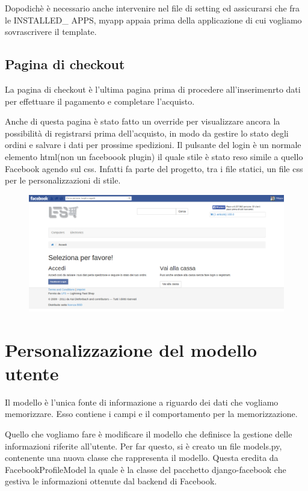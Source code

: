 Dopodichè è necessario anche intervenire nel file di setting ed assicurarsi che fra le INSTALLED\_ APPS, myapp appaia prima della applicazione di cui vogliamo sovrascrivere il template.

\subsection{Pagina di checkout}
La pagina di checkout è l'ultima pagina prima di procedere all'inserimenrto dati per effettuare il pagamento e completare l'acquisto.

Anche di questa pagina è stato fatto un override per visualizzare ancora la possibilità di registrarsi prima dell'acquisto, in modo da gestire lo stato degli ordini e salvare i dati per prossime spedizioni. Il pulsante del login è un normale elemento html(non un faceboook plugin) il quale stile è stato reso simile a quello Facebook agendo sul css. Infatti fa parte del progetto, tra i file statici, un file css per le personalizzazioni di stile.

\begin{figure}
\includegraphics[width=0.9\columnwidth]{img/checkout}
\end{figure}

\section{Personalizzazione del modello utente}
Il modello è l'unica fonte di informazione a riguardo dei dati che vogliamo memorizzare. Esso contiene i campi e il comportamento per la memorizzazione. 

Quello che vogliamo fare è modificare il modello che definisce la gestione delle informazioni riferite all'utente. Per far questo, si è creato un file models.py, contenente una nuova classe che rappresenta il modello. Questa eredita da FacebookProfileModel la quale è la classe del pacchetto django-facebook che gestiva le informazioni ottenute dal backend di Facebook.

